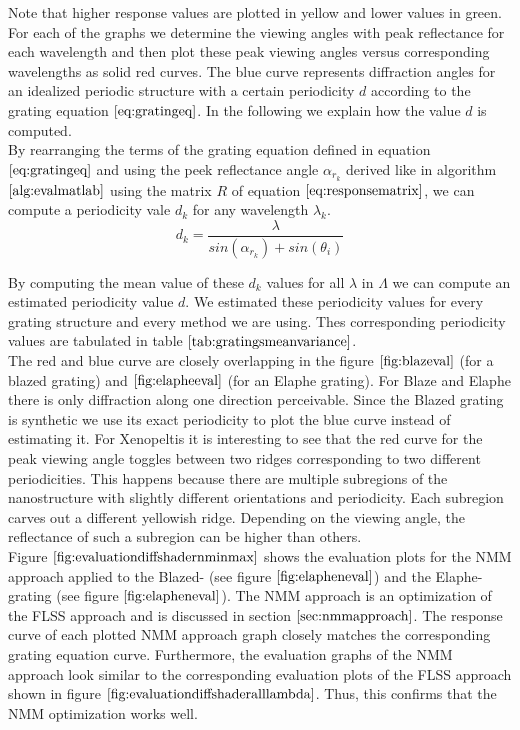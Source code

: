 Note that higher response values are plotted in yellow and lower values in green. For each of the graphs we determine the viewing angles with peak reflectance for each wavelength and then plot these peak viewing angles versus corresponding wavelengths as solid red curves. The blue curve represents diffraction angles for an idealized periodic structure with a certain periodicity $d$ according to the grating equation $\ref{eq:gratingeq}$. In the following we explain how the value $d$ is computed. \\

By rearranging the terms of the grating equation defined in equation $\ref{eq:gratingeq}$ and using the peek reflectance angle $\alpha_{r_k}$ derived like in algorithm $\ref{alg:evalmatlab}$ using the matrix $R$ of equation $\ref{eq:responsematrix}$, we can compute a periodicity vale $d_k$ for any wavelength $\lambda_k$.  
\begin{equation}
  d_k = \frac{\lambda}{sin(\alpha_{r_k}) + sin(\theta_i)}
\end{equation}

By computing the mean value of these $d_k$ values for all $\lambda$ in $\Lambda$ we can compute an estimated periodicity value $d$. We estimated these periodicity values for every grating structure and every method we are using. Thes corresponding periodicity values are tabulated in table $\ref{tab:gratingsmeanvariance}$. \\

The red and blue curve are closely overlapping in the figure $\ref{fig:blazeval}$ (for a blazed grating) and $\ref{fig:elapheeval}$ (for an Elaphe grating). For Blaze and Elaphe there is only diffraction along one direction perceivable. Since the Blazed grating is synthetic we use its exact periodicity to plot the blue curve instead of estimating it. For Xenopeltis it is interesting to see that the red curve for the peak viewing angle toggles between two ridges corresponding to two different periodicities. This happens because there are multiple subregions of the nanostructure with slightly different orientations and periodicity. Each subregion carves out a different yellowish ridge. Depending on the viewing angle, the reflectance of such a subregion can be higher than others. \\

Figure $\ref{fig:evaluationdiffshadernminmax}$ shows the evaluation plots for the NMM approach applied to the Blazed- (see figure $\ref{fig:elapheneval}$) and the Elaphe-grating (see figure $\ref{fig:elapheneval}$). The NMM approach is an optimization of the FLSS approach and is discussed in section $\ref{sec:nmmapproach}$. The response curve of each plotted NMM approach graph closely matches the corresponding grating equation curve. Furthermore, the evaluation graphs of the NMM approach look similar to the corresponding evaluation plots of the FLSS approach shown in figure $\ref{fig:evaluationdiffshaderalllambda}$. Thus, this confirms that the NMM optimization works well.

